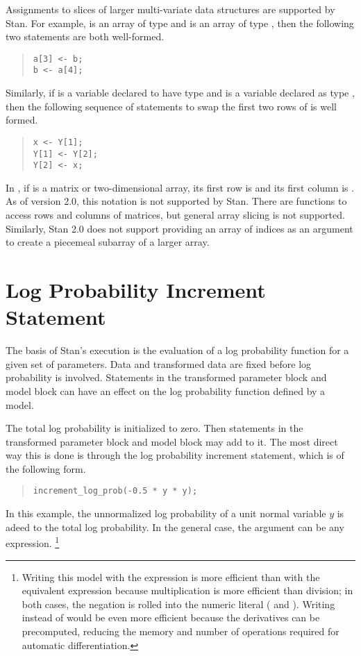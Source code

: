 Assignments to slices of larger multi-variate data structures are
supported by Stan.  For example,  is an array of type
 and  is an array of type , then
the following two statements are both well-formed.
%
\begin{quote}
\begin{Verbatim}
a[3] <- b;
b <- a[4];
\end{Verbatim}
\end{quote}
%
Similarly, if  is a variable declared to have type
 and  is a variable declared as type
, then the following sequence of statements to swap the
first two rows of  is well formed.
%
\begin{quote}
\begin{Verbatim}
x <- Y[1];
Y[1] <- Y[2];
Y[2] <- x;
\end{Verbatim}
\end{quote}
%

In \R, if  is a matrix or two-dimensional array, its first row
is  and its first column is .  As of version
2.0, this notation is not supported by Stan.  There are functions to
access rows and columns of matrices, but general array slicing is not
supported.  Similarly, Stan 2.0 does not support providing an array of
indices as an argument to create a piecemeal subarray of a larger
array.

\section{Log Probability Increment Statement}\label{increment-log-prob.section}

The basis of Stan's execution is the evaluation of a log probability
function for a given set of parameters.  Data and transformed data are
fixed before log probability is involved.  Statements in the
transformed parameter block and model block can have an effect on the
log probability function defined by a model.

The total log probability is initialized to zero.  Then statements in
the transformed parameter block and model block may add to it.  The
most direct way this is done is through the log probability increment
statement, which is of the following form.
%
\begin{quote}
\begin{Verbatim}
increment_log_prob(-0.5 * y * y);
\end{Verbatim}
\end{quote}
%
In this example, the unnormalized log probability of a unit normal
variable $y$ is adeed to the total log probability.  In the general
case, the argument can be any expression.%
%
\footnote{Writing this model with the expression 
  is more efficient than with the equivalent expression  because multiplication is more efficient than division; in
  both cases, the negation is rolled into the numeric literal
  ( and ).  Writing  instead of
   would be even more efficient because the derivatives
  can be precomputed, reducing the memory and number of operations
  required for automatic differentiation.}

